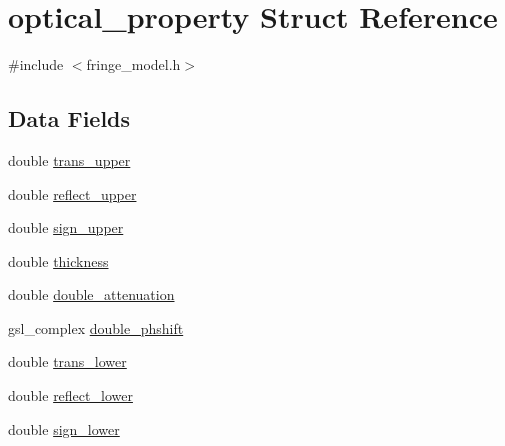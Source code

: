 \hypertarget{structoptical__property}{
\section{optical\_\-property Struct Reference}
\label{structoptical__property}
}


{\ttfamily \#include $<$fringe\_\-model.h$>$}\subsection*{Data Fields}
\begin{DoxyCompactItemize}
\item 
double \hyperlink{structoptical__property_a97c5d40160ec802fc519857500e13072}{trans\_\-upper}
\item 
double \hyperlink{structoptical__property_a1c483ffff6b6392a5200798f1d74077c}{reflect\_\-upper}
\item 
double \hyperlink{structoptical__property_afc3a820943b39f39fa102fd3f4fecc18}{sign\_\-upper}
\item 
double \hyperlink{structoptical__property_a515a607d457f93bc486e7e90dad7abab}{thickness}
\item 
double \hyperlink{structoptical__property_a558bb1c84d5da44820be51660781cc57}{double\_\-attenuation}
\item 
gsl\_\-complex \hyperlink{structoptical__property_a541278c1aa9254d59a00530bb188df61}{double\_\-phshift}
\item 
double \hyperlink{structoptical__property_a3e8917182777e9314832fd4efd9a2105}{trans\_\-lower}
\item 
double \hyperlink{structoptical__property_abf81db5da1e05a9f72d6baed4dea69e4}{reflect\_\-lower}
\item 
double \hyperlink{structoptical__property_a0aa625d6bded51f0b5e4fcb1a41d8ec1}{sign\_\-lower}
\end{DoxyCompactItemize}


